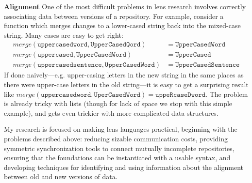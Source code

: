 \documentclass{article}
\begin{document}
{\bf Alignment} One of the most difficult problems in lens research involves correctly
associating data between versions of a repository. For example, consider a
function which merges changes to a lower-cased string back into
the mixed-case string. Many cases are easy to get right:
\begin{align*}
    \mathit{merge}(\mathtt{uppercasedword},\mathtt{UpperCasedQord})
        &= \mathtt{UpperCasedWord} \\
    \mathit{merge}(\mathtt{uppercased},\mathtt{UpperCasedWord})
        &= \mathtt{UpperCased} \\
    \mathit{merge}(\mathtt{uppercasedsentence},\mathtt{UpperCasedWord})
        &= \mathtt{UpperCasedSentence}
\end{align*}
If done naively---e.g. upper-casing letters in the new string in the same
places as there were upper-case letters in the old string---it is easy to
get a surprising result like $\mathit{merge}(\mathtt{uppercasedword},
\mathtt{UperCasedWord}) = \mathtt{uppeRcaseDword}$.  The problem is already
tricky with lists (though for lack of space we stop with this simple
example), and gets even trickier with more complicated data structures.

My research is focused on making lens languages practical, beginning with
the problems described above: reducing sizable communication costs,
providing symmetric synchronization tools to connect mutually incomplete
repositories, ensuring that the foundations can be instantiated with a
usable syntax, and developing techniques for identifying and using
information about the alignment between old and new versions of data.
\end{document}
